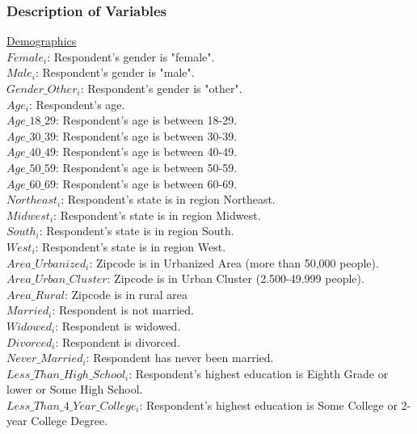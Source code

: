 \documentclass[11pt]{article}
\begin{document}
\subsubsection{Description of Variables}
\label{sec:appendixvariables}
\underline{Demographics} \\
$Female_i$: Respondent's gender is "female". \\[0.15em]
$Male_i$: Respondent's gender is "male".  \\[0.15em]
$Gender\_Other_i$: Respondent's gender is "other".  \\[0.15em]
$Age_i$: Respondent's age. \\[0.15em]
$Age\_18\_29$: Respondent's age is between 18-29.\\[0.15em]
$Age\_30\_39$: Respondent's age is between 30-39.\\[0.15em]
$Age\_40\_49$: Respondent's age is between 40-49.\\[0.15em]
$Age\_50\_59$: Respondent's age is between 50-59.\\[0.15em]
$Age\_60\_69$: Respondent's age is between 60-69.\\[0.15em]
$Northeast_i$: Respondent's state is in region Northeast. \\[0.15em]
$Midwest_i$: Respondent's state is in region Midwest. \\[0.15em]
$South_i$: Respondent's state is in region South. \\[0.15em]
$West_i$: Respondent's state is in region West. \\[0.15em]
$Area\_Urbanized_i$: Zipcode is in Urbanized Area (more than 50,000 people). \\[0.15em]
$Area\_Urban\_Cluster$: Zipcode is in Urban Cluster (2.500-49.999 people).\\[0.15em]
$Area\_Rural$: Zipcode is in rural area \\[0.15em]
$Married_i$: Respondent is not married. \\[0.15em]
$Widowed_i$: Respondent is widowed.\\[0.15em]
$Divorced_i$: Respondent is divorced.\\[0.15em]
$Never\_Married_i$: Respondent has never been married. \\[0.15em]
$Less\_Than\_High\_School_i$: Respondent's highest education is Eighth Grade or lower or Some High School.\\[0.15em]
$Less\_Than\_4\_Year\_College_i$: Respondent's highest education is Some College or 2-year College Degree.\\[0.15em]
\end{document}
